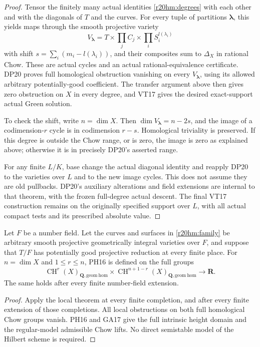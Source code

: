 \begin{proof}
Tensor the finitely many actual identities
\eqref{r20hm:degrees} with each other and with the diagonals
of $T$ and the curves.  For every tuple of partitions
$\boldsymbol\lambda$, this yields maps through the smooth
projective variety
\[
 V_{\boldsymbol\lambda}
   =T\times\prod_j C_j\times\prod_i S_i^{l(\lambda_i)}
\]
with shift $s=\sum_i(m_i-l(\lambda_i))$, and their composites
sum to $\Delta_X$ in rational Chow.  These are actual
cycles and an actual rational-equivalence certificate.
DP20 proves full homological obstruction vanishing on
every $V_{\boldsymbol\lambda}$, using its allowed arbitrary
potentially-good coefficient.  The transfer argument above
then gives zero obstruction on $X$ in every degree, and
VT17 gives the desired exact-support actual Green solution.

To check the shift, write $n=\dim X$.  Then
$\dim V_{\boldsymbol\lambda}=n-2s$, and the image of a
codimension-$r$ cycle is in codimension $r-s$.  Homological
triviality is preserved.  If this degree is outside the
Chow range, or is zero, the image is zero as explained
above; otherwise it is in precisely DP20's asserted range.

For any finite $L/K$, base change the actual diagonal
identity and reapply DP20 to the varieties over $L$ and to
the new image cycles.  This does not assume they are old
pullbacks.  DP20's auxiliary alterations and field extensions
are internal to that theorem, with the frozen full-degree
actual descent.  The final VT17 construction remains on
the originally specified support over $L$, with all actual
compact tests and its prescribed absolute value.
\end{proof}

\begin{corollary}
\label{r20hm:global}
Let $F$ be a number field.  Let the curves and surfaces in
\eqref{r20hm:family} be arbitrary smooth projective
geometrically integral varieties over $F$, and suppose that
$T/F$ has potentially good projective reduction at every
finite place.  For $n=\dim X$ and $1\leq r\leq n$, PH16
is defined on the full groups
\[
 \operatorname{CH}^{r}(X)_{\mathbf Q,\mathrm{geom\ hom}}
 \times
 \operatorname{CH}^{n+1-r}(X)_{\mathbf Q,\mathrm{geom\ hom}}
 \longrightarrow\mathbf R.
 \tag{HM20.7}\label{r20hm:height}
\]
The same holds after every finite number-field extension.
\end{corollary}

\begin{proof}
Apply the local theorem at every finite completion, and
after every finite extension of those completions.
All local obstructions on both full homological Chow groups
vanish.  PH16 and GA17 give the full intrinsic height
domain and the regular-model admissible Chow lifts.
No direct semistable model of the Hilbert scheme is required.
\end{proof}

